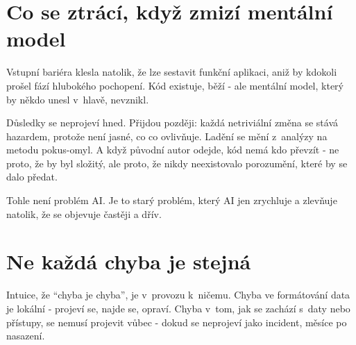 \section{Co se ztrácí, když zmizí mentální model}

Vstupní bariéra klesla natolik, že lze sestavit funkční aplikaci, aniž by kdokoli prošel fází hlubokého pochopení.
Kód existuje, běží - ale mentální model, který by někdo unesl v~hlavě, nevznikl.

Důsledky se neprojeví hned.
Přijdou později: každá netriviální změna se stává hazardem, protože není jasné, co co ovlivňuje.
Ladění se mění z~analýzy na metodu pokus-omyl.
A když původní autor odejde, kód nemá kdo převzít - ne proto, že by byl složitý, ale proto, že nikdy neexistovalo porozumění, které by se dalo předat.

Tohle není problém AI.
Je to starý problém, který AI jen zrychluje a zlevňuje natolik, že se objevuje častěji a dřív.

\section{Ne každá chyba je stejná}

Intuice, že \enquote{chyba je chyba}, je v~provozu k~ničemu.
Chyba ve formátování data je lokální - projeví se, najde se, opraví.
Chyba v~tom, jak se zachází s~daty nebo přístupy, se nemusí projevit vůbec - dokud se neprojeví jako incident, měsíce po nasazení.


